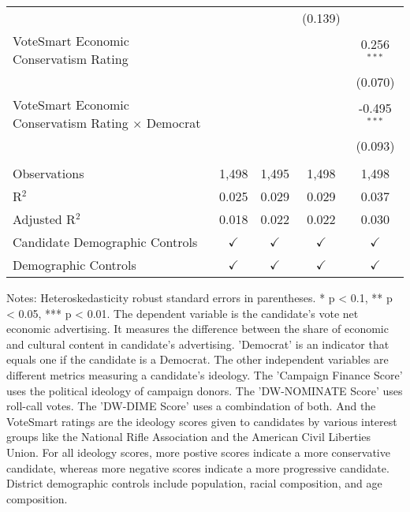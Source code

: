 \begin{table}[htbp]
\begin{tabular}{lcccc}
                                                                &                &                & (0.139)        &   \\   
      VoteSmart Economic Conservatism Rating                    &                &                &                & 0.256$^{***}$\\   
                                                                &                &                &                & (0.070)\\   
      VoteSmart Economic Conservatism Rating $\times$ Democrat  &                &                &                & -0.495$^{***}$\\   
                                                                &                &                &                & (0.093)\\   
       \\
      Observations                                              & 1,498          & 1,495          & 1,498          & 1,498\\  
      R$^2$                                                     & 0.025          & 0.029          & 0.029          & 0.037\\  
      Adjusted R$^2$                                            & 0.018          & 0.022          & 0.022          & 0.030\\  
      Candidate Demographic Controls                            & $\checkmark$   & $\checkmark$   & $\checkmark$   & $\checkmark$\\   
      Demographic Controls                                      & $\checkmark$   & $\checkmark$   & $\checkmark$   & $\checkmark$\\   
      \bottomrule
   \end{tabular}
   
   \par \raggedright 
   \footnotesize Notes: Heteroskedasticity robust standard errors in parentheses. * p < 0.1, ** p < 0.05, *** p < 0.01.  The dependent variable is the candidate's vote net economic advertising. It measures the difference between the share of economic and cultural content in candidate's advertising. 'Democrat' is an indicator that equals one if the candidate is a Democrat. The other independent variables are different metrics measuring a candidate's ideology. The 'Campaign Finance Score' uses the political ideology of campaign donors. The 'DW-NOMINATE Score' uses roll-call votes. The 'DW-DIME Score' uses a combindation of both. And the VoteSmart ratings are the ideology scores given to candidates by various interest groups like the National Rifle Association and the American Civil Liberties Union. For all ideology scores, more postive scores indicate a more conservative candidate, whereas more negative scores indicate a more progressive candidate. District demographic controls include population, racial composition, and age composition.
\end{table}



